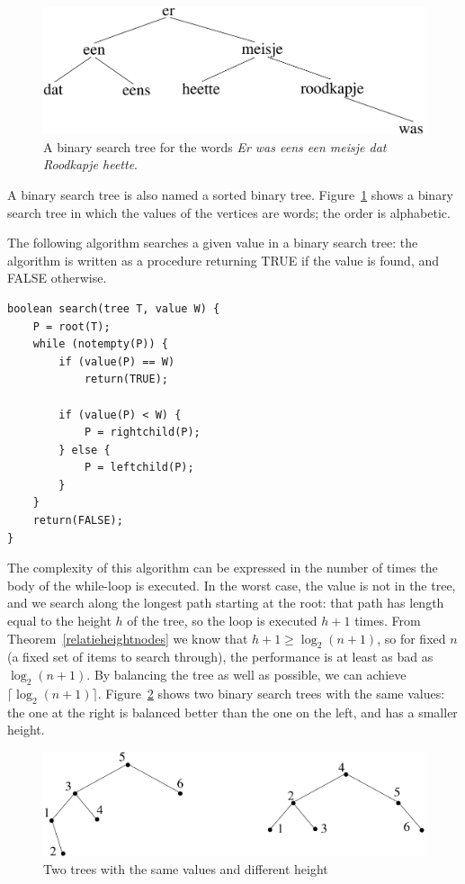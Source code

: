 \begin{figure}[ht]
	\centering
	\includegraphics[width=0.55\linewidth,keepaspectratio]{binboom1}
	\caption{A binary search tree for the words
	{\em Er was eens een meisje dat Roodkapje heette}. \label{binboom1}}
\end{figure}

A binary search tree is also named a sorted binary tree. Figure~\ref{binboom1} shows a binary search tree in which the values
of the vertices are words; the order is alphabetic.

The following algorithm searches a given value in a binary search tree: the
algorithm is written as a procedure returning TRUE if the value is
found, and FALSE otherwise.
\begin{center}
\begin{BVerbatim}
boolean search(tree T, value W) {
	P = root(T);
	while (notempty(P)) {
		if (value(P) == W)
			return(TRUE);

		if (value(P) < W) {
			P = rightchild(P);
		} else {
			P = leftchild(P);
		}
	}
	return(FALSE);
}
\end{BVerbatim}
\end{center}

The complexity of this algorithm can be expressed in the number of
times the body of the while-loop is executed. In the worst case,
the value is not in the tree, and we search along the longest path
starting at the root: that path has length equal to the height $h$ of
the tree, so the loop is executed $h+1$ times. From
Theorem~\ref{relatieheightnodes} we know that $h+1 \geq \log_2(n+1)$, so
for fixed $n$ (a fixed set of items to search through), the performance is at least as bad as $\log_2(n+1)$. By balancing
the tree as well as possible, we can achieve $\lceil \log_2(n+1)
\rceil$. Figure~\ref{balanced1} shows two binary search trees with the
same values: the one at the right is balanced better than the one on
the left, and has a smaller height.

\begin{figure}[ht]
	\centering
	\includegraphics[width=0.6\linewidth,keepaspectratio]{balanced1}
	\caption{Two trees with the same values and different height \label{balanced1}}
\end{figure}


